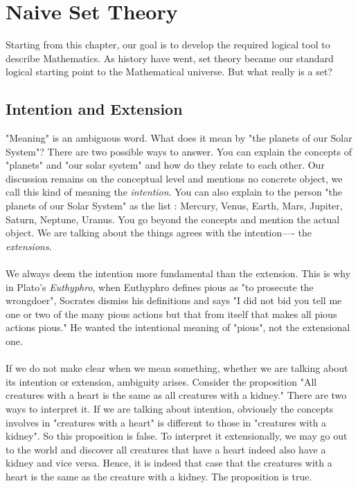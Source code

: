 \chapter{Naive Set Theory}
Starting from this chapter, our goal is to develop the required logical tool to describe Mathematics. As history have went, set theory became our standard logical starting point to the Mathematical universe. But what really is a set?
\section{Intention and Extension}
"Meaning" is an ambiguous word. What does it mean by "the planets of our Solar System"? There are two possible ways to answer. You can explain the concepts of "planets" and "our solar system" and how do they relate to each other. Our discussion remains on the conceptual level and mentions no concrete object, we call this kind of meaning the \textit{intention}. You can also explain to the person "the planets of our Solar System" as the list : Mercury, Venus, Earth, Mars, Jupiter, Saturn, Neptune, Uranus. You go beyond the concepts and mention the actual object. We are talking about the things agrees with the intention---- the \textit{extensions}.\\
~\\
We always deem the intention more fundamental than the extension. This is why in Plato's \textit{Euthyphro}, when Euthyphro defines pious as "to prosecute the wrongdoer", Socrates dismiss his definitions and says "I did not bid you tell me one or two of the many pious actions but that from itself that makes all pious actions pious." He wanted the intentional meaning of "pious", not the extensional one.\\
~\\
If we do not make clear when we mean something, whether we are talking about its intention or extension, ambiguity arises. Consider the proposition "All creatures with a heart is the same as all creatures with a kidney." There are two ways to interpret it. If we are talking about intention, obviously the concepts involves in "creatures with a heart" is different to those in "creatures with a kidney". So this proposition is false. To interpret it extensionally, we may go out to the world and discover all creatures that have a heart indeed also have a kidney and vice versa. Hence, it is indeed that case that the creatures with a heart is the same as the creature with a kidney. The proposition is true.\\
~\\
